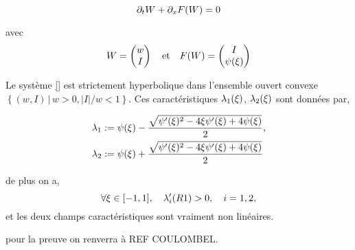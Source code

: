 \begin{equation}
\label{eq:SHcond1}
\partial_t W + \partial_x F(W) = 0\\
\end{equation}

avec 
\begin{equation}
W = 
\begin{pmatrix}
w\\
I\\
\end{pmatrix}
\quad
\mbox{et}
\quad
F(W) =
\begin{pmatrix}
I\\
\psi(\xi)\\
\end{pmatrix}
\end{equation}


\begin{proposition} 
Le système \ref{} est strictement hyperbolique dans l'ensemble ouvert convexe $\left\{(w,I)\, |\, w > 0, |I|/w < 1\right\}$. Ces caractéristiques $\lambda_1(\xi)$, $\lambda_2(\xi)$ sont données par,

\begin{equation}
\label{eq:SHvp}
\begin{aligned}
\lambda_1 &:= \psi(\xi) - \frac{\sqrt{\psi'(\xi)^2 - 4\xi\psi'(\xi) + 4\psi(\xi)}}{2},\\
\lambda_2 &:= \psi(\xi) + \frac{\sqrt{\psi'(\xi)^2 - 4\xi\psi'(\xi) + 4\psi(\xi)}}{2}
\end{aligned}
\end{equation}

de plus on a,
\begin{equation}
\forall \xi \in [-1,1],\quad \lambda_i'(R1) > 0, \quad i=1,2,
\end{equation}
et les deux champs caractéristiques sont vraiment non linéaires.
\end{proposition}

pour la preuve on renverra à REF COULOMBEL.




